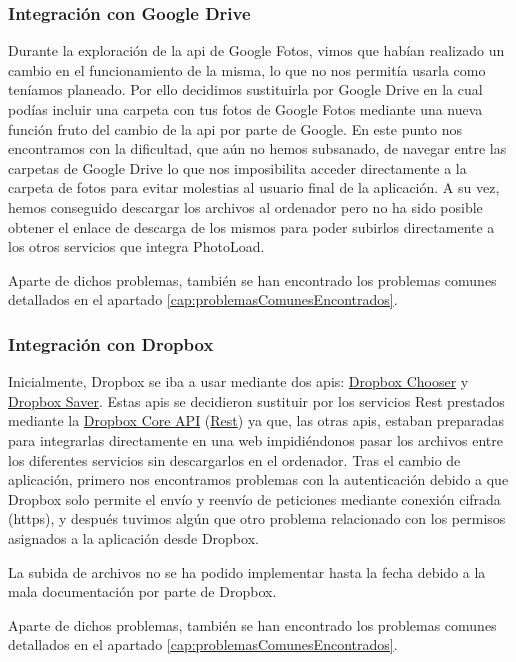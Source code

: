 \documentclass{scrartcl}
\begin{document}
\subsubsection{Integración con Google Drive}
Durante la exploración de la api de Google Fotos, vimos que habían realizado un cambio en el funcionamiento de la misma, lo que no nos permitía usarla como teníamos planeado. Por ello decidimos sustituirla por Google Drive en la cual podías incluir una carpeta con tus fotos de Google Fotos mediante una nueva función fruto del cambio de la api por parte de Google. En este punto nos encontramos con la dificultad, que aún no hemos subsanado, de navegar entre las carpetas de Google Drive lo que nos imposibilita acceder directamente a la carpeta de fotos para evitar molestias al usuario final de la aplicación. A su vez, hemos conseguido descargar los archivos al ordenador pero no ha sido posible obtener el enlace de descarga de los mismos para poder subirlos directamente a los otros servicios que integra PhotoLoad.

Aparte de dichos problemas, también se han encontrado los problemas comunes detallados en el apartado \ref{cap:problemasComunesEncontrados}.
\subsubsection{Integración con Dropbox}
Inicialmente, Dropbox se iba a usar mediante dos apis: \href{https://www.dropbox.com/developers/dropins/chooser/js}{Dropbox Chooser} y \href{https://www.dropbox.com/developers/dropins/saver}{Dropbox Saver}. Estas apis se decidieron sustituir por los servicios Rest prestados mediante la \href{https://www.dropbox.com/developers/core}{Dropbox Core API} (\href{https://www.dropbox.com/developers/core/docs}{Rest}) ya que, las otras apis, estaban preparadas para integrarlas directamente en una web impidiéndonos pasar los archivos entre los diferentes servicios sin descargarlos en el ordenador. Tras el cambio de aplicación, primero nos encontramos problemas con la autenticación debido a que Dropbox solo permite el envío y reenvío de peticiones mediante conexión cifrada (https), y después tuvimos algún que otro problema relacionado con los permisos asignados a la aplicación desde Dropbox.

La subida de archivos no se ha podido implementar hasta la fecha debido a la mala documentación por parte de Dropbox.

Aparte de dichos problemas, también se han encontrado los problemas comunes detallados en el apartado \ref{cap:problemasComunesEncontrados}.
\end{document}
